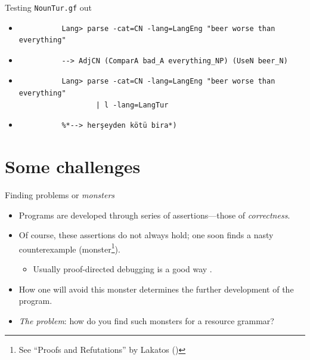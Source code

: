 \documentclass{beamer}
\begin{document}
  \begin{frame}[fragile]{Testing \texttt{NounTur.gf} out}
    \begin{itemize}
      \item<1->
        \begin{lstlisting}
          Lang> parse -cat=CN -lang=LangEng "beer worse than everything"
        \end{lstlisting}
      \item<2->
        \begin{lstlisting}
          --> AdjCN (ComparA bad_A everything_NP) (UseN beer_N)
        \end{lstlisting}
      \item<3->
        \begin{lstlisting}
          Lang> parse -cat=CN -lang=LangEng "beer worse than everything"
                  | l -lang=LangTur
        \end{lstlisting}
      \item<4->
        \begin{lstlisting}
          %*--> herşeyden kötü bira*)
        \end{lstlisting}
    \end{itemize}
  \end{frame}

  \section{Some challenges}

  \begin{frame}{Finding problems or \emph{monsters}}
    \begin{itemize}
      \item<1-> Programs are developed through series of assertions---those
        of \emph{correctness}.
      \item<2-> Of course, these assertions do not always hold; one soon finds a
        nasty counterexample (monster\footnote{See ``Proofs and Refutations''
        by Lakatos (\cite{lakatos1976proofs})}).
          \begin{itemize}
            \item<3-> Usually \alert{proof-directed debugging} is a good way
              \cite{harper1999proof}.
          \end{itemize}
      \item<4-> How one will avoid this monster determines the further
        development of the program.
      \item<5-> \emph{The problem}: how do you find such monsters for a resource
        grammar?
    \end{itemize}
  \end{frame}
\end{document}
